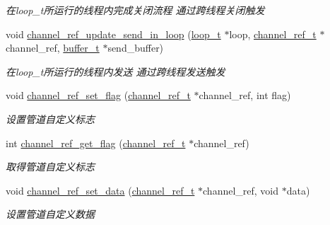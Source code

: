 \begin{DoxyCompactItemize}
\begin{DoxyCompactList}\small\item\em 在loop\+\_\+t所运行的线程内完成关闭流程 通过跨线程关闭触发 \end{DoxyCompactList}\item 
void \hyperlink{a00049_ab2afcbb2288d9654f7eb656a8c242167_ab2afcbb2288d9654f7eb656a8c242167}{channel\+\_\+ref\+\_\+update\+\_\+send\+\_\+in\+\_\+loop} (\hyperlink{a00051_a9c3ad1cd2de83e09f3a7b59fa82c94ee_a9c3ad1cd2de83e09f3a7b59fa82c94ee}{loop\+\_\+t} $\ast$loop, \hyperlink{a00051_a151271c9d188ef28d4d24bb81dcc1263_a151271c9d188ef28d4d24bb81dcc1263}{channel\+\_\+ref\+\_\+t} $\ast$channel\+\_\+ref, \hyperlink{a00051_aad99a77d28bd81d3d36d0ea569c9482d_aad99a77d28bd81d3d36d0ea569c9482d}{buffer\+\_\+t} $\ast$send\+\_\+buffer)
\begin{DoxyCompactList}\small\item\em 在loop\+\_\+t所运行的线程内发送 通过跨线程发送触发 \end{DoxyCompactList}\item 
void \hyperlink{a00049_a754666526c935285bd6c9367513b5832_a754666526c935285bd6c9367513b5832}{channel\+\_\+ref\+\_\+set\+\_\+flag} (\hyperlink{a00051_a151271c9d188ef28d4d24bb81dcc1263_a151271c9d188ef28d4d24bb81dcc1263}{channel\+\_\+ref\+\_\+t} $\ast$channel\+\_\+ref, int flag)
\begin{DoxyCompactList}\small\item\em 设置管道自定义标志 \end{DoxyCompactList}\item 
int \hyperlink{a00049_a684027d23ecd45142ee91678972b48da_a684027d23ecd45142ee91678972b48da}{channel\+\_\+ref\+\_\+get\+\_\+flag} (\hyperlink{a00051_a151271c9d188ef28d4d24bb81dcc1263_a151271c9d188ef28d4d24bb81dcc1263}{channel\+\_\+ref\+\_\+t} $\ast$channel\+\_\+ref)
\begin{DoxyCompactList}\small\item\em 取得管道自定义标志 \end{DoxyCompactList}\item 
void \hyperlink{a00049_aa639e4f322194aa76b0d01368f086bc0_aa639e4f322194aa76b0d01368f086bc0}{channel\+\_\+ref\+\_\+set\+\_\+data} (\hyperlink{a00051_a151271c9d188ef28d4d24bb81dcc1263_a151271c9d188ef28d4d24bb81dcc1263}{channel\+\_\+ref\+\_\+t} $\ast$channel\+\_\+ref, void $\ast$data)
\begin{DoxyCompactList}\small\item\em 设置管道自定义数据 \end{DoxyCompactList}\item 

\end{DoxyCompactItemize}
